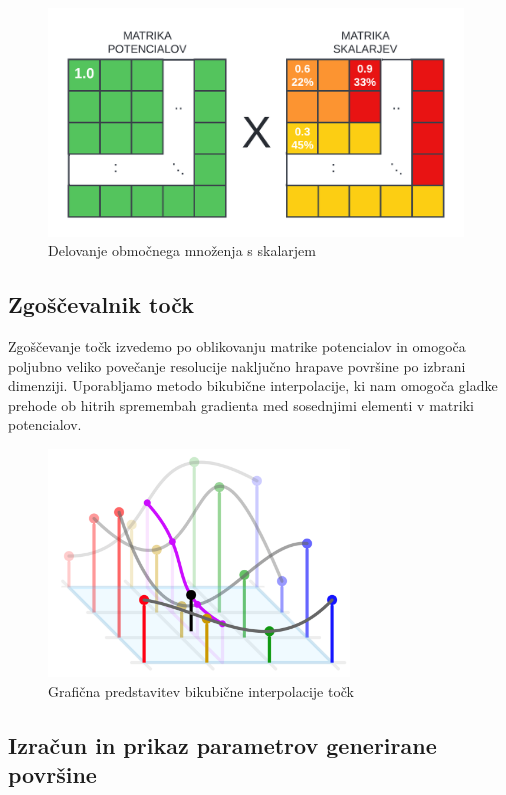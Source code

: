 \documentclass[a4paper,twoside,openright,12pt,slovene]{book}
\begin{document}
\begin{figure}[H]
    \centering
    \includegraphics[width=110mm]{Slike/Območno množenje.png}
    \caption{Delovanje območnega množenja s skalarjem}
    \label{fig:območnoMnoženje}
\end{figure}


\subsection{Zgoščevalnik točk}
\label{zgoščevalnikTočk}

Zgoščevanje točk izvedemo po oblikovanju matrike potencialov in omogoča poljubno veliko povečanje resolucije naključno hrapave površine po izbrani dimenziji. Uporabljamo metodo bikubične interpolacije, ki nam omogoča gladke prehode ob hitrih spremembah gradienta med sosednjimi elementi v matriki potencialov.

\begin{figure}[H]
    \centering
    \includegraphics[width=80mm]{Slike/bikubična interpolacija.png}
    \caption{Grafična predstavitev bikubične interpolacije točk}
    \label{fig:my_label}
\end{figure}


\subsection{Izračun in prikaz parametrov generirane površine}
\label{izračunInPrikaz}
\end{document}

